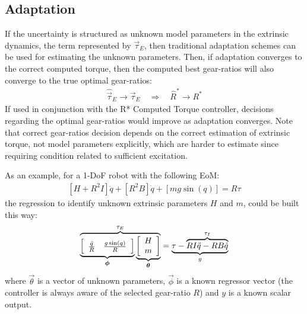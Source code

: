 \subsection{Adaptation}
If the uncertainty is structured as unknown model parameters in the extrinsic dynamics, the term represented by $\vec{\tau}_E$, then traditional adaptation schemes can be used for estimating the unknown parameters. Then, if adaptation converges to the correct computed torque, then the computed best gear-ratios will also converge to the true optimal gear-ratios:
%
\begin{align}
	\hat{\vec{\tau}}_E \rightarrow \vec{\tau}_E 
    \quad \Rightarrow \quad 
    \hat{R}^* \rightarrow R^*
 \label{eq:adapt}
\end{align}
%
If used in conjunction with the R* Computed Torque controller, decisions regarding the optimal gear-ratios would improve as adaptation converges. Note that correct gear-ratios decision depends on the correct estimation of extrinsic torque, not model parameters explicitly, which are harder to estimate since requiring condition related to sufficient excitation. 

As an example, for a 1-DoF robot with the following EoM:
%
\begin{align}
	\left[ H + R^2 I \right] \ddot{q} + \left[ R^2 B \right] \dot{q} + \left[ mg \sin( q ) \right] = R \tau
\end{align}
%
the regression to identify unknown extrinsic parameters $H$ and $m$, could be built this way:
%
%
\begin{align}
	\overbrace{
	\underbrace{ \left[
	\begin{array}{c c}
		\frac{\ddot{q}}{R} &  \frac{ g \sin( q ) }{R}
	\end{array} \right] }_{\vec{\phi}}
	\underbrace{ \left[
	\begin{array}{c}
		H \\ m 
	\end{array} \right] }_{\vec{\theta}}
	}^{\tau_E} = \underbrace{ \tau -  \overbrace{ R I \ddot{q} -  R B \dot{q} }^{\tau_I} }_{y}
\end{align}
%
where $\vec{\theta}$ is a vector of unknown parameters, $\vec{\phi}$ is a known regressor vector (the controller is always aware of the selected gear-ratio $R$) and $y$ is a known scalar output. 


